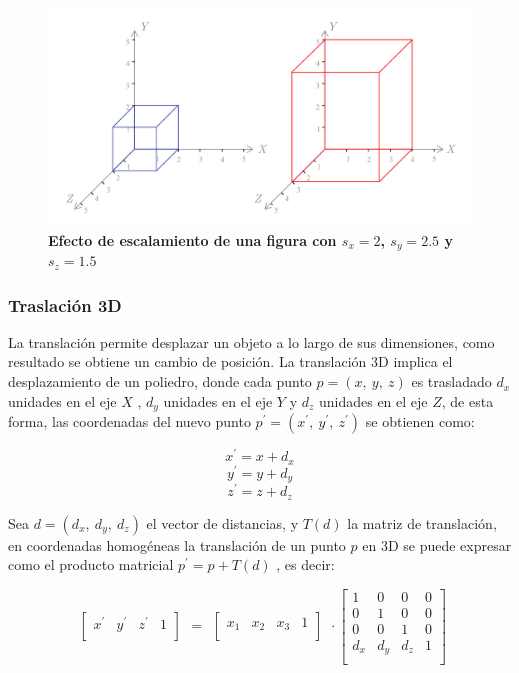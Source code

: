 \begin{center}
\begin{figure}[h]
\includegraphics[width=12cm]{Img/GEO/geo-escala0.jpg}
\centering
\caption{\textbf{\footnotesize{Efecto de escalamiento de una figura con $s_x=2$, $s_y=2.5$ y $s_z=1.5$}}}
\end{figure}
\end{center}

\subsubsection{Traslación 3D}
La translación permite desplazar un objeto a lo largo de sus dimensiones, como resultado se obtiene un cambio de posición. La translación 3D implica el desplazamiento de un poliedro, donde cada punto $p = (x,\ y,\ z)$ es trasladado $d_x$ unidades en el eje $X$ , $d_y$ unidades en el eje $Y$ y $d_z$ unidades en el eje $Z$, de esta forma, las coordenadas del nuevo punto
$p^{\prime} = ({x}^{\prime}, \ {y}^{\prime}, \ {z}^{\prime})$ se obtienen como:

$${x}^{\prime} = x + d_x$$
$${y}^{\prime} = y + d_y$$
$${z}^{\prime} = z + d_z$$

Sea $d = (d_{x},\ d_{y},\ d_{z})$ el vector de distancias, y $T(d)$ la matriz de translación, en
coordenadas homogéneas la translación de un punto $p$ en 3D se puede expresar como el producto matricial $p^{\prime} = p + T(d)$ , es decir:

\begin{equation}
\begin{array}{rccl}
\left[
\begin{array}{rccl}
{x}^{\prime} & {y}^{\prime} & {z}^{\prime} & 1\\
\end{array}
\right]
\end{array}
=
\begin{array}{rccl}
\left[
\begin{array}{rccl}
x_{1} & x_{2} & x_{3} & 1\\
\end{array}
\right]
\end{array} 
\cdot
\left[
\begin{array}{rccl}
1 & 0 & 0 & 0\\
0 & 1 & 0 & 0\\
0 & 0 & 1 & 0\\
d_{x} & d_{y} & d_{z} & 1\\
\end{array}
\right]
\end{equation}

